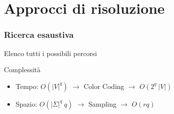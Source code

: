 \section{Approcci di risoluzione}

\begin{frame}
	\sectionpage
	\centering
\end{frame}

\begin{frame}
	\frametitle{Ricerca esaustiva}
	Elenco tutti i possibili percorsi 

	Complessità
	\begin{itemize}
		\item Tempo: $O(|V|^q)$ $\rightarrow$ Color Coding $\rightarrow$ $O(2^q\ |V|)$
		\item Spazio: $O(|\Sigma|^q\ q)$ $\rightarrow$ Sampling $\rightarrow$ $O(rq)$
	\end{itemize}
\end{frame}

